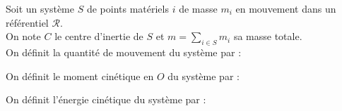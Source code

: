 \documentclass[a4paper]{article}
\begin{document}
\pagestyle{fancy}
\fancyhf{}
\setlength{\headheight}{15pt}

\begin{center}
	\large{}
\end{center}


Soit un système \(S\) de points matériels \(i\) de masse \(m_i\) en mouvement dans un référentiel \(\mathcal{R}\).\\
On note \(C\) le centre d'inertie de \(S\) et \(m=\displaystyle\sum\limits_{i\in S}m_i\) sa masse totale.\\
On définit la quantité de mouvement du système par :\begin{center}\end{center}
On définit le moment cinétique en \(O\) du système par :\begin{center}\end{center}
On définit l'énergie cinétique du système par :\begin{center}\end{center}
\end{document}
